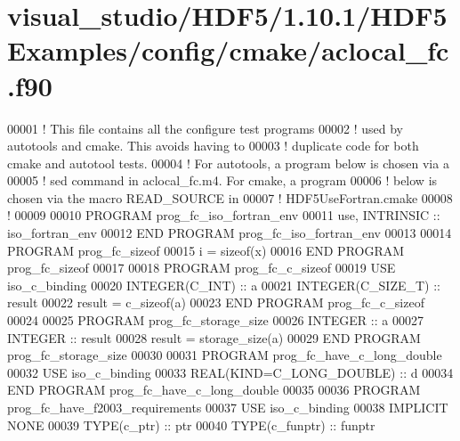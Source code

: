 \hypertarget{visual__studio_2_h_d_f5_21_810_81_2_h_d_f5_examples_2config_2cmake_2aclocal__fc_8f90_source}{}\section{visual\+\_\+studio/\+H\+D\+F5/1.10.1/\+H\+D\+F5\+Examples/config/cmake/aclocal\+\_\+fc.f90}
\label{visual__studio_2_h_d_f5_21_810_81_2_h_d_f5_examples_2config_2cmake_2aclocal__fc_8f90_source}

\begin{DoxyCode}
00001 \textcolor{comment}{! This file contains all the configure test programs }
00002 \textcolor{comment}{! used by autotools and cmake. This avoids having to}
00003 \textcolor{comment}{! duplicate code for both cmake and autotool tests.}
00004 \textcolor{comment}{! For autotools, a program below is chosen via a}
00005 \textcolor{comment}{! sed command in aclocal\_fc.m4. For cmake, a program}
00006 \textcolor{comment}{! below is chosen via the macro READ\_SOURCE in }
00007 \textcolor{comment}{! HDF5UseFortran.cmake}
00008 \textcolor{comment}{!}
00009 
00010 \textcolor{keyword}{PROGRAM} prog\_fc\_iso\_fortran\_env
00011   use, \textcolor{keywordtype}{INTRINSIC} :: iso\_fortran\_env
00012 \textcolor{keyword}{END PROGRAM }prog\_fc\_iso\_fortran\_env
00013 
00014 \textcolor{keyword}{PROGRAM} prog\_fc\_sizeof
00015   i = sizeof(x)
00016 \textcolor{keyword}{END PROGRAM }prog\_fc\_sizeof
00017 
00018 \textcolor{keyword}{PROGRAM} prog\_fc\_c\_sizeof
00019   \textcolor{keywordtype}{USE }iso\_c\_binding
00020   \textcolor{keywordtype}{INTEGER(C\_INT)} :: a
00021   \textcolor{keywordtype}{INTEGER(C\_SIZE\_T)} :: result
00022   result = c\_sizeof(a)
00023 \textcolor{keyword}{END PROGRAM }prog\_fc\_c\_sizeof
00024 
00025 \textcolor{keyword}{PROGRAM} prog\_fc\_storage\_size
00026   \textcolor{keywordtype}{INTEGER} :: a
00027   \textcolor{keywordtype}{INTEGER} :: result
00028   result = storage\_size(a)
00029 \textcolor{keyword}{END PROGRAM }prog\_fc\_storage\_size
00030 
00031 \textcolor{keyword}{PROGRAM} prog\_fc\_have\_c\_long\_double
00032   \textcolor{keywordtype}{USE }iso\_c\_binding
00033   \textcolor{keywordtype}{REAL(KIND=C\_LONG\_DOUBLE)} :: d
00034 \textcolor{keyword}{END PROGRAM }prog\_fc\_have\_c\_long\_double
00035 
00036 \textcolor{keyword}{PROGRAM} prog\_fc\_have\_f2003\_requirements
00037   \textcolor{keywordtype}{USE }iso\_c\_binding
00038   \textcolor{keywordtype}{IMPLICIT NONE}
00039   \textcolor{keywordtype}{TYPE}(c\_ptr) :: ptr
00040   \textcolor{keywordtype}{TYPE}(c\_funptr) :: funptr

\end{DoxyCode}
